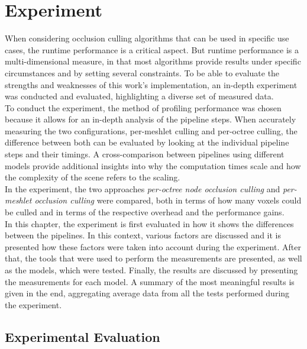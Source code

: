 \chapter{Experiment} \label{cpt-experiment}

When considering occlusion culling algorithms that can be used in specific use cases, the runtime 
performance is a critical aspect. But runtime performance is a multi-dimensional measure, in that 
most algorithms provide results under specific circumstances and by setting several constraints.
To be able to evaluate the strengths and weaknesses of this work's implementation, an in-depth  
experiment was conducted and evaluated, highlighting a diverse set of measured data. \\

\noindent
To conduct the experiment, the method of profiling performance was chosen because it allows for 
an in-depth analysis of the pipeline steps. When accurately measuring the two configurations, 
per-meshlet culling and per-octree culling, the difference between both can be evaluated by looking 
at the individual pipeline steps and their timings. A cross-comparison between pipelines using 
different models provide additional insights into why the computation times scale and how the 
complexity of the scene refers to the scaling. \\

\noindent
In the experiment, the two approaches \emph{per-octree node occlusion culling} and 
\emph{per-meshlet occlusion culling} were compared, both in terms of how many voxels could be 
culled and in terms of the respective overhead and the performance gains. \\

\noindent
In this chapter, the experiment is first evaluated in how it shows the differences between the pipelines. 
In this context, various factors are discussed and it is presented how these factors were taken into account 
during the experiment. After that, the tools that were used to perform the measurements are presented, as 
well as the models, which were tested. Finally, the results are discussed by presenting the measurements 
for each model. A summary of the most meaningful results is given in the end, aggregating average data from 
all the tests performed during the experiment.

\section{Experimental Evaluation} \label{sec-experimental-evaluation}

